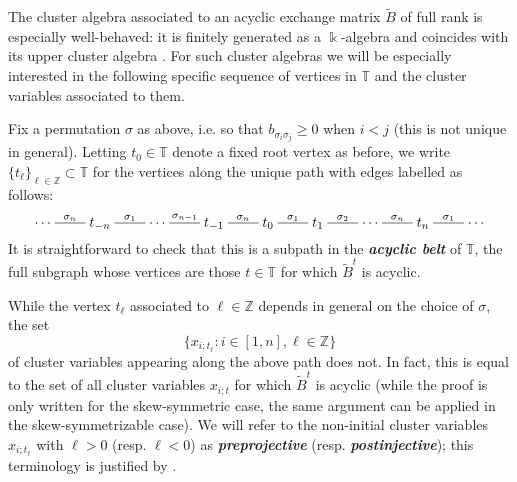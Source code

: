 \documentclass[12pt]{amsart}
\newcommand{\saySS}[1]{\say[SS]{\color{blue}{\bf SS:}\;#1}}
\newcommand{\sayDR}[1]{\say[DR]{\color{red}{\bf DR:}\;#1}}
\newcommand{\newword}[1]{\textbf{\emph{#1}}}
\newcommand{\TT}{\mathbb{T}}
\newcommand{\ZZ}{\mathbb{Z}}
\newcommand{\kk}{\Bbbk}
\newcommand{\dashname}[1]{\stackrel{#1}{\begin{picture}(22,3)\put(0,2.5){\line(1,0){22}}\end{picture}}}
\newcommand{\Zidx}{\ell}
\theoremstyle{remark}
\numberwithin{equation}{section}
\numberwithin{figure}{section}
\begin{document}
The cluster algebra associated to an acyclic exchange matrix $\widetilde{B}$ of full rank is especially well-behaved: it is finitely generated as a $\kk$-algebra and coincides with its upper cluster algebra \cite{BFZ05}.
For such cluster algebras we will be especially interested in the following specific sequence of vertices in $\TT$ and the cluster variables associated to them.

Fix a permutation $\sigma$ as above, i.e. so that $b_{\sigma_i \sigma_j} \geq 0$ when $i < j$ (this is not unique in general). Letting $t_0 \in \TT$ denote a fixed root vertex as before, we write $\{t_\Zidx\}_{\Zidx \in \ZZ} \subset \TT$ for the vertices along the unique path with edges labelled as follows:
\begin{equation}
  \cdots
  \dashname{\sigma_n}
  t_{-n}
  \dashname{\sigma_1}
  \cdots
  \dashname{\sigma_{n-1}}
  t_{-1}
  \dashname{\sigma_n}
  t_0
  \dashname{\sigma_1}
  t_1
  \dashname{\sigma_2}
  \cdots
  \dashname{\sigma_n}
  t_n
  \dashname{\sigma_1}
  \cdots
  \label{eq:path}
\end{equation}
It is straightforward to check that this is a subpath in the \newword{acyclic belt} of $\TT$, the full subgraph whose vertices are those $t \in \TT$ for which $\widetilde{B}^t$ is acyclic.

While the vertex $t_\ell$ associated to $\Zidx \in \ZZ$ depends in general on the choice of $\sigma$, the set $$\{x_{i;t_\Zidx}: i \in [1,n], \Zidx \in \ZZ\}$$ of cluster variables appearing along the above path does not. In fact, this is equal to the set of all cluster variables $x_{i;t}$ for which $\widetilde{B}^t$ is acyclic \cite[Corollary 4]{CK06} (while the proof is only written for the skew-symmetric case, the same argument can be applied in the skew-symmetrizable case). 
We will refer to the non-initial cluster variables $x_{i;t_\Zidx}$ with $\Zidx>0$ (resp. $\Zidx<0$) as \newword{preprojective} (resp. \newword{postinjective}); this terminology is justified by . 
\end{document}
